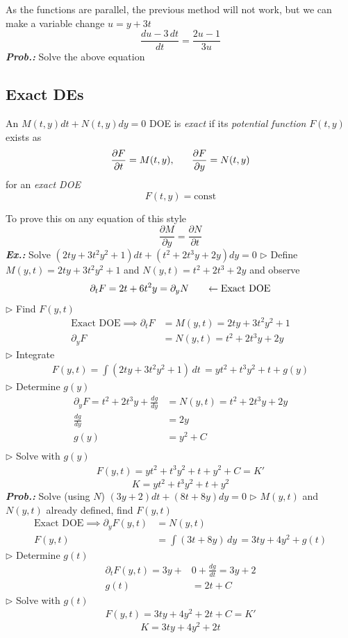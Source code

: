 \documentclass[a4paper]{article}
\begin{document}
As the functions are parallel, the previous method will not work, but we can make a variable change $u=y+3t$
$$
\boxed{\frac{du-3\,dt}{dt}=\frac{2u-1}{3u}}
$$
\vspace{2ex}\textit{\textbf{Prob.:}} Solve the above equation

\subsection{Exact DEs}
An $M(t,y)dt+N(t,y)dy=0$ DOE is \textit{exact} if its \textit{potential function} $F(t,y)$ exists as
$$
\frac{\partial F}{\partial t}=M(t,y),\hspace{4ex} \frac{\partial F}{\partial y}=N(t,y)
$$
for an \textit{exact DOE} 
$$
F(t,y)=\text{const}
$$

To prove this on any equation of this style
$$
\frac{\partial M}{\partial y}=\frac{\partial N}{\partial t}
$$
\vspace{2ex}\textbf{\textit{Ex.: }}Solve $(2ty+3t^{2}y^{2}+1)dt+(t^{2}+2t^{3}y+2y)dy=0$ 
$\triangleright$ Define $M(y,t)=2ty+3t^{2}y^{2}+1$ and $N(y,t)=t^{2}+2t^{3}+2y$ and observe
$$
\partial_{t}F=2t+6t^{2}y=\partial_{y}N\hspace{4ex}\leftarrow\text{Exact DOE}
$$
$\triangleright$ Find $F(y,t)$
\begin{align}
\text{Exact DOE}\implies \partial _{t}F&=M(y,t)=2ty+3t^{2}y^{2}+1 \\
\partial_{y}F&=N(y,t)=t^{2}+2t^{3}y+2y
\end{align}
$\triangleright$ Integrate
\begin{align}
F(y,t)=\int (2ty+3t^{2}y^{2}+1) \, dt\, =yt^{2}+t^{3}y^{2}+t+g(y)
\end{align}
$\triangleright$ Determine $g(y)$
\begin{align}
\partial_{y}F=t^{2}+2t^{3}y+\frac{dg}{dy}&=N(y,t)=t^{2}+2t^{3}y+2y \\
\frac{dg}{dy}&=2y \\
g(y)&=y^{2}+C \\
\end{align}
$\triangleright$ Solve with $g(y)$
\begin{align}
F(y,t)=yt^{2}+t^{3}y^{2}+t+y^{2}+C=K'
\end{align}
$$
\boxed{K=yt^{2}+t^{3}y^{2}+t+y^{2}}
$$
\vspace{2ex}\textbf{\textit{Prob.: }}Solve (using $N$) $(3y+2)dt+(8t+8y)dy=0$
$\triangleright$ $M(y,t)$ and $N(y,t)$ already defined, find $F(y,t)$ 
\begin{align}
\text{Exact DOE}\implies \partial_{y}F(y,t)&=N(y,t) \\
F(y,t)&=\int (3t+8y) \, dy\, =3ty+4y^{2}+g(t)
\end{align}
$\triangleright$ Determine $g(t)$
\begin{align}
\partial_{t}F(y,t)=3y+&0+\frac{dg}{dt}=3y+2 \\
g(t)&=2t+C
\end{align}
$\triangleright$ Solve with $g(t)$ 
\begin{align}
F(y,t)=3ty+4y^{2}+2t+C=K'
\end{align}
$$
\boxed{K=3ty+4y^{2}+2t}
$$
\end{document}
